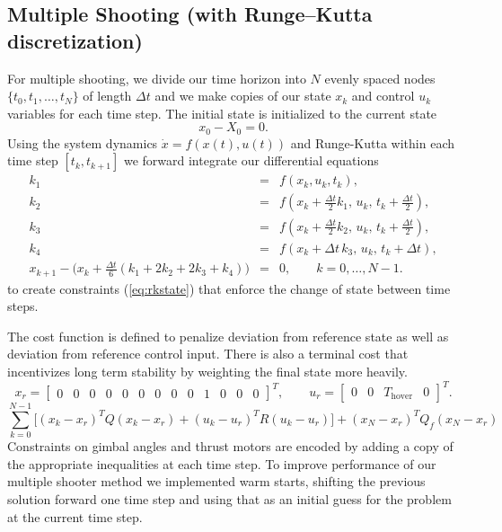 \documentclass[]{article}
\begin{document}
\subsection*{Multiple Shooting (with Runge–Kutta discretization)}
	For multiple shooting, we divide our time horizon into $N$ evenly spaced nodes $\{ t_0, t_1, \ldots, t_N \}$ of length $\Delta t$ and we make copies of our state $x_k$ and control $u_k$ variables for each time step.  The initial state is initialized to the current state
	\begin{equation*}
		x_0 - X_0 = 0.
	\end{equation*}
	Using the system dynamics $\dot{x} =  f(x(t),u(t))$ and Runge-Kutta within each time step $[t_k, t_{k+1}]$ we forward integrate our differential equations 
	\begin{eqnarray}
	 	k_1 & = & f(x_k, u_k, t_k), \nonumber \\[6pt] \nonumber 
	 	k_2 & = & f\!\left(x_k + \tfrac{\Delta t}{2} k_1,\, u_k,\, t_k + \tfrac{\Delta t}{2}\right), \\[6pt] \nonumber
	 	k_3 & = & f\!\left(x_k + \tfrac{\Delta t}{2} k_2,\, u_k,\, t_k + \tfrac{\Delta t}{2}\right), \\[6pt] \nonumber
	 	k_4 & = & f\!\left(x_k + \Delta t\, k_3,\, u_k,\, t_k + \Delta t\right), \\[10pt]
	 	x_{k+1} - \Big(x_k + \tfrac{\Delta t}{6}(k_1 + 2k_2 + 2k_3 + k_4)\Big) &=& 0, 
	 	\qquad k = 0,\dots, N-1. \label{eq:rkstate}
     \end{eqnarray}
     to create constraints (\ref{eq:rkstate}) that enforce the change of state between time steps.
        
	The cost function is defined to penalize deviation from reference state as well as deviation from reference control input. There is also a terminal cost that incentivizes long term stability by weighting the final state more heavily.
        \[
        x_r =
        \begin{bmatrix}
        0 & 0 & 0 & 0 & 0 & 0 & 0 & 0 & 0 & 1 & 0 & 0 & 0
        \end{bmatrix}^{\!T},
        \qquad
        u_r =
        \begin{bmatrix}
        0 & 0 & T_{\text{hover}} & 0
        \end{bmatrix}^{\!T}.
        \]
         \begin{equation}
         	 \sum_{k=0}^{N-1}  \Big[(x_k -  x_{r})^T Q (x_k - x_{r}) + (u_k -  u_{r})^T R (u_k - u_{r}) \Big] + (x_N -  x_{r})^T Q_f (x_N - x_{r})
         \end{equation}
	Constraints on gimbal angles and thrust motors are encoded by adding a copy of the appropriate inequalities at each time step. 	To improve performance of our multiple shooter method we implemented warm starts, shifting the previous solution forward one time step and using that as an initial guess for the problem at the current time step.
	
\end{document}
